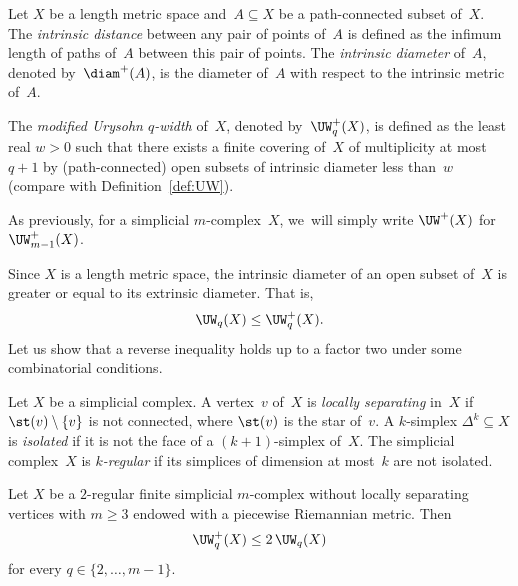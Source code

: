 \begin{definition} \label{def:UW'}
Let $X$ be a length metric space and~$A \subseteq X$ be a path-connected subset of~$X$.
The \emph{intrinsic distance} between any pair of points of~$A$ is defined as the infimum length of paths of~$A$ between this pair of points.
The \emph{intrinsic diameter} of~$A$, denoted by~$\diam^+(A)$, is the diameter of~$A$ with respect to the intrinsic metric of~$A$.

The \emph{modified Urysohn $q$-width} of~$X$, denoted by~$\UW^+_q(X)$, is defined as the least real $w>0$ such that there exists a finite covering of~$X$ of multiplicity at most~$q+1$ by (path-connected) open subsets of intrinsic diameter less than~$w$ (compare with Definition~\ref{def:UW}).

As previously, for a simplicial $m$\nobreakdash-complex~$X$, we~will simply write $\UW^+(X)$ for $\UW^+_{m-1}(X)$.
\end{definition}

Since $X$ is a length metric space, the intrinsic diameter of an open subset of~$X$ is greater or equal to its extrinsic diameter.
That is,
\[
\UW_q(X) \leq \UW^+_q(X).
\]
Let us show that a reverse inequality holds up to a factor two under some combinatorial conditions.

\begin{definition}
Let $X$ be a simplicial complex.
A vertex~$v$ of~$X$ is \emph{locally separating} in~$X$ if $\st(v) \setminus \{v\}$ is not connected, where $\st(v)$ is the star of~$v$.
A $k$-simplex $\Delta^k \subseteq X$ is \emph{isolated} if it is not the face of a $(k+1)$-simplex of~$X$.
The simplicial complex~$X$ is \emph{$k$-regular} if its simplices of dimension at most~$k$ are not isolated.
\end{definition}

\begin{proposition} \label{prop:UW+2UW}
Let $X$ be a $2$-regular finite simplicial $m$\nobreakdash-complex without locally separating vertices with $m \geq 3$ endowed with a piecewise Riemannian metric.
Then
\[
\UW^+_q(X) \leq 2 \, \UW_q(X)
\]
for every $q \in \{2,\dots,m-1\}$.
\end{proposition}


